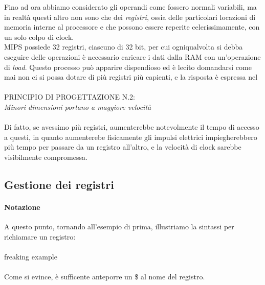 \documentclass[class=book, crop=false]{standalone}
\begin{document}
Fino ad ora abbiamo considerato gli operandi come fossero normali variabili, ma in realtà questi altro non sono che dei \emph{registri}, ossia delle particolari locazioni di memoria interne al processore e che possono essere reperite celerissimamente, con un solo colpo di clock.\\
MIPS possiede 32 registri, ciascuno di 32 bit, per cui ogniqualvolta si debba eseguire delle operazioni è necessario caricare i dati dalla RAM con un'operazione di \emph{load}. Questo processo può apparire dispendioso ed è lecito domandarsi come mai non ci si possa dotare di più registri più capienti, e la risposta è espressa nel\\\\
PRINCIPIO DI PROGETTAZIONE N.2:\\\textit{Minori dimensioni portano a maggiore velocità}\\\\
Di fatto, se avessimo  più registri, aumenterebbe notevolmente il tempo di accesso a questi, in quanto aumenterebe fisicamente gli impulsi elettrici impiegherebbero più tempo per passare da un registro all'altro, e la velocità di clock sarebbe visibilmente compromessa.\\
\subsection{Gestione dei registri}
\paragraph{Notazione}
A questo punto, tornando all'esempio di prima, illustriamo la sintassi per richiamare un registro:\\\\
freaking example\\\\
Come si evince, è sufficente anteporre un \$ al nome del registro.\\
\end{document}

